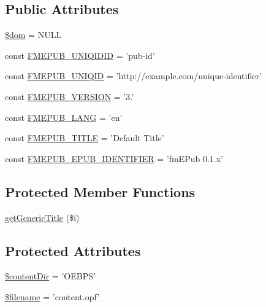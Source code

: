 \subsection*{\-Public \-Attributes}
\begin{DoxyCompactItemize}
\item 
\hyperlink{classFunnyMonkey_1_1EPUB_1_1EPUBPackage_ae9e0d92e7a247f32310e19539203f0bd}{\$dom} = \-N\-U\-L\-L
\item 
const \hyperlink{classFunnyMonkey_1_1EPUB_1_1EPUBPackage_ab628985d9d179f80d0213f9792a81059}{\-F\-M\-E\-P\-U\-B\-\_\-\-U\-N\-I\-Q\-I\-D\-I\-D} = 'pub-\/id'
\item 
const \hyperlink{classFunnyMonkey_1_1EPUB_1_1EPUBPackage_aebf61188ec24076a27a500e854493bc6}{\-F\-M\-E\-P\-U\-B\-\_\-\-U\-N\-I\-Q\-I\-D} = 'http\-://example.\-com/unique-\/identifier'
\item 
const \hyperlink{classFunnyMonkey_1_1EPUB_1_1EPUBPackage_adf5ddbba67ec2bfd0ac973c4c085d53f}{\-F\-M\-E\-P\-U\-B\-\_\-\-V\-E\-R\-S\-I\-O\-N} = '3.'
\item 
const \hyperlink{classFunnyMonkey_1_1EPUB_1_1EPUBPackage_afad8ca7c3f1421ced4f0f4e1b1c288d7}{\-F\-M\-E\-P\-U\-B\-\_\-\-L\-A\-N\-G} = 'en'
\item 
const \hyperlink{classFunnyMonkey_1_1EPUB_1_1EPUBPackage_a79ed8e362323bba8b7b530dedde733e6}{\-F\-M\-E\-P\-U\-B\-\_\-\-T\-I\-T\-L\-E} = '\-Default \-Title'
\item 
const \hyperlink{classFunnyMonkey_1_1EPUB_1_1EPUBPackage_a02fc3ae1f134fcac70861dc84c90607f}{\-F\-M\-E\-P\-U\-B\-\_\-\-E\-P\-U\-B\-\_\-\-I\-D\-E\-N\-T\-I\-F\-I\-E\-R} = 'fm\-E\-Pub 0.\-1.x'
\end{DoxyCompactItemize}
\subsection*{\-Protected \-Member \-Functions}
\begin{DoxyCompactItemize}
\item 
\hyperlink{classFunnyMonkey_1_1EPUB_1_1EPUBPackage_a2f2d202666a489e59a6c1a9d881f8b4e}{get\-Generic\-Title} (\$i)
\end{DoxyCompactItemize}
\subsection*{\-Protected \-Attributes}
\begin{DoxyCompactItemize}
\item 
\hyperlink{classFunnyMonkey_1_1EPUB_1_1EPUBPackage_a72e9188b12cd6c29d0b4a502856b7d3a}{\$content\-Dir} = '\-O\-E\-B\-P\-S'
\item 
\hyperlink{classFunnyMonkey_1_1EPUB_1_1EPUBPackage_a4bab44c0c2b43c7b7dd9315f024a6ce8}{\$filename} = 'content.\-opf'
\end{DoxyCompactItemize}


